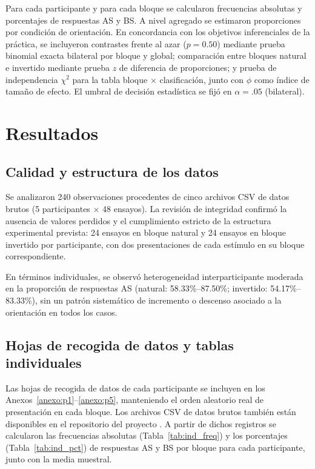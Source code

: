 \documentclass[stu, 12pt, letterpaper, donotrepeattitle, floatsintext, natbib]{apa7}
\begin{document}
Para cada participante y para cada bloque se calcularon frecuencias absolutas y porcentajes de respuestas AS y BS. A nivel agregado se estimaron proporciones por condición de orientación. En concordancia con los objetivos inferenciales de la práctica, se incluyeron contrastes frente al azar (\(p=0.50\)) mediante prueba binomial exacta bilateral por bloque y global; comparación entre bloques natural e invertido mediante prueba \(z\) de diferencia de proporciones; y prueba de independencia \(\chi^2\) para la tabla bloque \(\times\) clasificación, junto con \(\phi\) como índice de tamaño de efecto. El umbral de decisión estadística se fijó en \(\alpha = .05\) (bilateral).

\section{Resultados}

\subsection{Calidad y estructura de los datos}

Se analizaron 240 observaciones procedentes de cinco archivos CSV de datos brutos (5 participantes \(\times\) 48 ensayos). La revisión de integridad confirmó la ausencia de valores perdidos y el cumplimiento estricto de la estructura experimental prevista: 24 ensayos en bloque natural y 24 ensayos en bloque invertido por participante, con dos presentaciones de cada estímulo en su bloque correspondiente. 

En términos individuales, se observó heterogeneidad interparticipante moderada en la proporción de respuestas AS (natural: 58.33\%--87.50\%; invertido: 54.17\%--83.33\%), sin un patrón sistemático de incremento o descenso asociado a la orientación en todos los casos.

\subsection{Hojas de recogida de datos y tablas individuales}

Las hojas de recogida de datos de cada participante se incluyen en los Anexos~\ref{anexo:p1}--\ref{anexo:p5}, manteniendo el orden aleatorio real de presentación en cada bloque. Los archivos CSV de datos brutos también están disponibles en el repositorio del proyecto \citep{amaya2026repo}. A partir de dichos registros se calcularon las frecuencias absolutas (Tabla~\ref{tab:ind_freq}) y los porcentajes (Tabla~\ref{tab:ind_pct}) de respuestas AS y BS por bloque para cada participante, junto con la media muestral.
\end{document}
